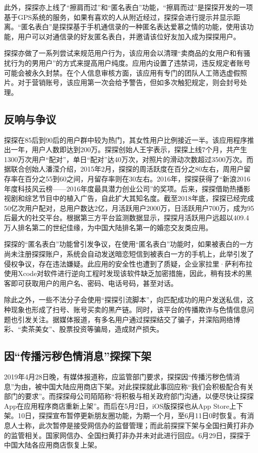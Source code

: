 \documentclass[UTF8]{ctexart}
\begin{document}
此外，探探亦上线了“擦肩而过”和“匿名表白”功能，“擦肩而过”是探探开发的一项基于GPS系统的服务，如果有喜欢的人从附近经过，探探会进行提示并显示距离。“匿名表白”是探探基于手机通信录的一种匿名表达爱慕之情的功能，使用该功能，用户可以对通信录的好友匿名表白，并邀请该位好友加入成为探探用户。

探探亦做了一系列尝试来规范用户行为，该应用会以清理“卖商品的女用户和有骚扰行为的男用户”的方式来提高用户纯度。应用内设置了违禁词，违反规定者账号可能会被永久封禁。在个人信息审核方面，该应用有专门的团队人工筛选虚假照片。对于营销账号，该应用第一次会给予警告，但如多次触犯规定，则会封号处理。

\subsection{反响与争议}
探探在85后到90后的用户群中较为热门，其女性用户比例接近一半。该应用程序推出一年，用户人数即达到200万。探探创始人王宇表示，探探上线7个月，共产生1300万次用户“配对”，单日“配对”达40万次，对照片的滑动次数超过3500万次。而据联合创始人潘滢介绍，2015年2月，探探的周活跃度在百分之80左右，周用户留存率在百分之55到60之间，月留存率则在30左右。2016年，探探获得了“新浪2016年度科技风云榜——2016年度最具潜力创业公司”的奖项。后来，探探借助热播影视剧和综艺节目中的植入广告，自此扩大其知名度。截至2018年底，探探已经完成50亿次用户配对，总用户数达2亿，月活跃用户2000万，日活跃用户700万，成为95后最大的社交平台。根据第三方平台监测数据显示，探探月活跃用户远超以409.4万人排名第二的世纪佳缘，为中国大陆排名第一的婚恋交友类应用。

探探的“匿名表白”功能曾引发争议，在使用“匿名表白”功能时，如果被表白的一方尚未注册探探账户，系统会自动发送暗恋短信到被表白一方的手机上，此举引发了侵权争议，存在违法嫌疑。此应用的安全性也遭到了质疑，企业家拉里·萨利布拉使用Xcode对软件进行逆向工程时发现该软件缺乏加密措施，因此，稍有技术的黑客即可获取用户的用户名、密码、电话号码，甚至对话。

除此之外，一些不法分子会使用“探探引流脚本”，向匹配成功的用户发送私信，这种现象也形成了扫号、账号买卖的黑产链。同时，该平台的传播欺诈与色情信息问题也引发关注。据媒体报道，有多名用户通过探探结交了骗子，并深陷网络博彩、“卖茶美女”、股票投资等骗局，造成财产损失。

\subsection{因“传播污秽色情消息”探探下架}

2019年4月28日晚，有媒体报道称，应监管部门要求，探探因“传播污秽色情消息”为由，被中国大陆应用商店下架。对此探探就此事回应称“我们会积极配合有关部门的要求”。而探探母公司陌陌称“将积极与相关政府部门沟通，以便尽快让探探App在应用程序商店重新上架”。而后在5月2日，iOS版探探也从App Store上下架。10日，探探宣布暂停更新朋友圈功能，为期一个月，至6月11日0时恢复。有消息人士称，此次暂停是接受网信办的监督管理；而此前探探下架与全国扫黄打非办的监管相关。国家网信办、全国扫黄打非办并未对此进行回应。6月29日，探探于中国大陆各应用商店恢复上架。
\end{document}
